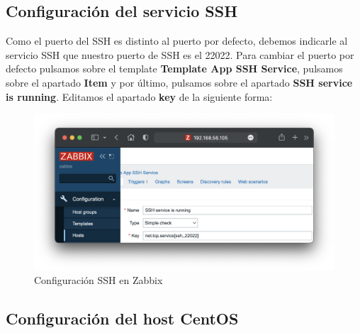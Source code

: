 \subsection{Configuración del servicio SSH}
Como el puerto del SSH es distinto al puerto por defecto, debemos indicarle al servicio SSH que nuestro puerto de SSH es el 22022. Para cambiar el puerto por defecto pulsamos sobre el template \textbf{Template App SSH Service}, pulsamos sobre el apartado \textbf{Item} y por último, pulsamos sobre el apartado \textbf{SSH service is running}. Editamos el apartado \textbf{key} de la siguiente forma:
    \begin{figure}[H]
        \centering
        \includegraphics[scale=0.5]{images/ip_items.png}
        \caption{Configuración SSH en Zabbix}
        \label{fig:ip_items}
    \end{figure}
\subsection{Configuración del host CentOS}
